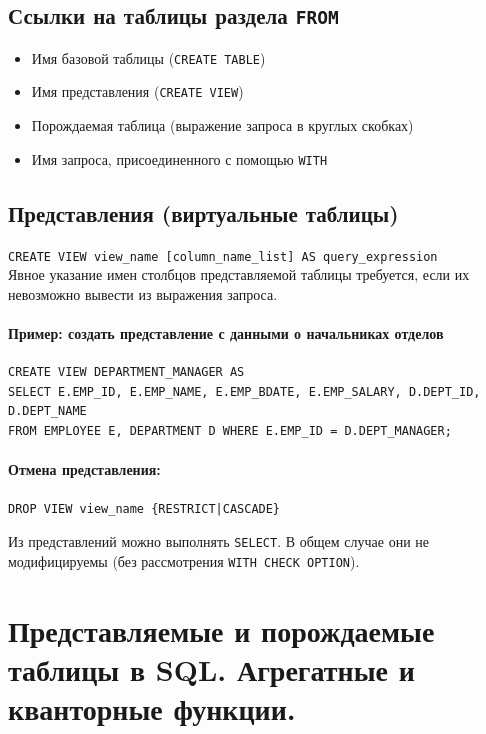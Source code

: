 \documentclass[a4paper,12pt]{article}
\begin{document}
\subsection{Ссылки на таблицы раздела \texttt{FROM}}

\begin{itemize}
    \item Имя базовой таблицы (\texttt{CREATE TABLE})
    \item Имя представления (\texttt{CREATE VIEW})
    \item Порождаемая таблица (выражение запроса в круглых скобках)
    \item Имя запроса, присоединенного с помощью \texttt{WITH}
\end{itemize}

\subsection{Представления (виртуальные таблицы)}

\texttt{CREATE VIEW view\_name [column\_name\_list] AS query\_expression}  
\\
Явное указание имен столбцов представляемой таблицы требуется, если их невозможно вывести из выражения запроса.

\paragraph{Пример: создать представление с данными о начальниках отделов}  
\begin{lstlisting}
CREATE VIEW DEPARTMENT_MANAGER AS
SELECT E.EMP_ID, E.EMP_NAME, E.EMP_BDATE, E.EMP_SALARY, D.DEPT_ID, D.DEPT_NAME
FROM EMPLOYEE E, DEPARTMENT D WHERE E.EMP_ID = D.DEPT_MANAGER;
\end{lstlisting}

\paragraph{Отмена представления:}  
\texttt{DROP VIEW view\_name \{RESTRICT|CASCADE\}}

Из представлений можно выполнять \texttt{SELECT}. В общем случае они не модифицируемы (без рассмотрения \texttt{WITH CHECK OPTION}).

\section{Представляемые и порождаемые таблицы в SQL. Агрегатные и кванторные функции.}
\end{document}
